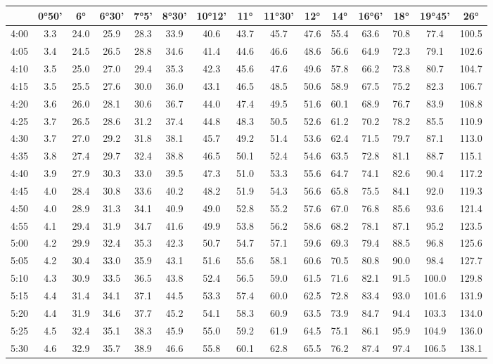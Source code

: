 \begin{footnotesize}\begin{tabular}{c | c | c | c | c | c | c | c | c | c | c | c | c | c | c}
		\space&0°50'&6°&6°30'&7°5'&8°30'&10°12'&11°&11°30'&12°&14°&16°6'&18°&19°45'&26°\\\hline
		4:00&3.3&24.0&25.9&28.3&33.9&40.6&43.7&45.7&47.6&55.4&63.6&70.8&77.4&100.5\\\hline
		4:05&3.4&24.5&26.5&28.8&34.6&41.4&44.6&46.6&48.6&56.6&64.9&72.3&79.1&102.6\\\hline
		4:10&3.5&25.0&27.0&29.4&35.3&42.3&45.6&47.6&49.6&57.8&66.2&73.8&80.7&104.7\\\hline
		4:15&3.5&25.5&27.6&30.0&36.0&43.1&46.5&48.5&50.6&58.9&67.5&75.2&82.3&106.7\\\hline
		4:20&3.6&26.0&28.1&30.6&36.7&44.0&47.4&49.5&51.6&60.1&68.9&76.7&83.9&108.8\\\hline
		4:25&3.7&26.5&28.6&31.2&37.4&44.8&48.3&50.5&52.6&61.2&70.2&78.2&85.5&110.9\\\hline
		4:30&3.7&27.0&29.2&31.8&38.1&45.7&49.2&51.4&53.6&62.4&71.5&79.7&87.1&113.0\\\hline
		4:35&3.8&27.4&29.7&32.4&38.8&46.5&50.1&52.4&54.6&63.5&72.8&81.1&88.7&115.1\\\hline
		4:40&3.9&27.9&30.3&33.0&39.5&47.3&51.0&53.3&55.6&64.7&74.1&82.6&90.4&117.2\\\hline
		4:45&4.0&28.4&30.8&33.6&40.2&48.2&51.9&54.3&56.6&65.8&75.5&84.1&92.0&119.3\\\hline
		4:50&4.0&28.9&31.3&34.1&40.9&49.0&52.8&55.2&57.6&67.0&76.8&85.6&93.6&121.4\\\hline
		4:55&4.1&29.4&31.9&34.7&41.6&49.9&53.8&56.2&58.6&68.2&78.1&87.1&95.2&123.5\\\hline
		5:00&4.2&29.9&32.4&35.3&42.3&50.7&54.7&57.1&59.6&69.3&79.4&88.5&96.8&125.6\\\hline
		5:05&4.2&30.4&33.0&35.9&43.1&51.6&55.6&58.1&60.6&70.5&80.8&90.0&98.4&127.7\\\hline
		5:10&4.3&30.9&33.5&36.5&43.8&52.4&56.5&59.0&61.5&71.6&82.1&91.5&100.0&129.8\\\hline
		5:15&4.4&31.4&34.1&37.1&44.5&53.3&57.4&60.0&62.5&72.8&83.4&93.0&101.6&131.9\\\hline
		5:20&4.4&31.9&34.6&37.7&45.2&54.1&58.3&60.9&63.5&73.9&84.7&94.4&103.3&134.0\\\hline
		5:25&4.5&32.4&35.1&38.3&45.9&55.0&59.2&61.9&64.5&75.1&86.1&95.9&104.9&136.0\\\hline
		5:30&4.6&32.9&35.7&38.9&46.6&55.8&60.1&62.8&65.5&76.2&87.4&97.4&106.5&138.1\\\hline

\end{tabular}
\end{footnotesize}
